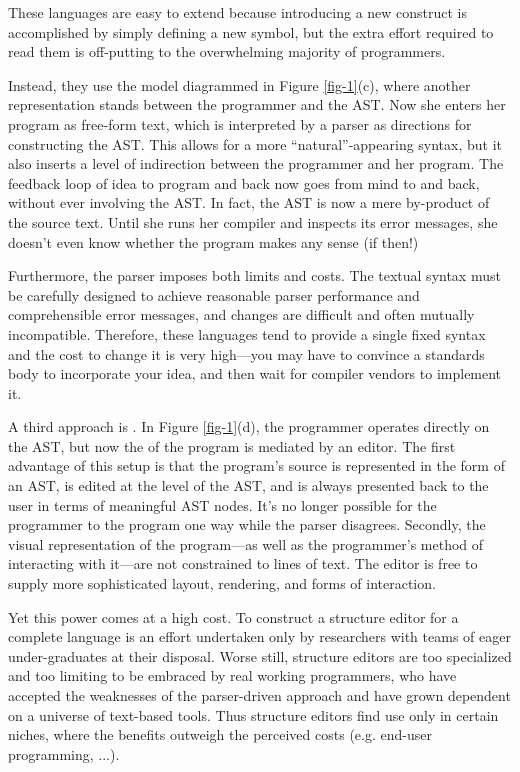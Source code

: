 These languages are easy to extend because introducing a new construct is accomplished by simply defining a new symbol, but the extra effort required to read them is off-putting to the overwhelming majority of programmers.

Instead, they use the model diagrammed in Figure \ref{fig-1}(c), where another representation stands between the programmer and the AST. Now she enters her program as free-form text, which is interpreted by a parser as directions for constructing the AST. This allows for a more ``natural''-appearing syntax, but it also inserts a level of indirection between the programmer and her program. The feedback loop of idea to program and back now goes from mind to  and back, without ever involving the AST. In fact, the AST is now a mere by-product of the source text. Until she runs her compiler and inspects its error messages, she doesn't even know whether the program makes any sense (if then!)

Furthermore, the parser imposes both limits and costs. The textual syntax must be carefully designed to achieve reasonable parser performance and comprehensible error messages, and changes are difficult and often mutually incompatible. Therefore, these languages tend to provide a single fixed syntax and the cost to change it is very high---you may have to convince a standards body to incorporate your idea, and then wait for compiler vendors to implement it.

A third approach is . In Figure \ref{fig-1}(d), the programmer operates directly on the AST, but now the  of the program is mediated by an editor. The first advantage of this setup is that the program's source is represented in the form of an AST, is edited at the level of the AST, and is always presented back to the user in terms of meaningful AST nodes. It's no longer possible for the programmer to  the program one way while the parser disagrees. Secondly, the visual representation of the program---as well as the programmer's method of interacting with it---are not constrained to lines of text. The editor is free to supply more sophisticated layout, rendering, and forms of interaction.

Yet this power comes at a high cost. To construct a structure editor for a complete language is an effort undertaken only by researchers with teams of eager under-graduates at their disposal. Worse still, structure editors are too specialized and too limiting to be embraced by real working programmers, who have accepted the weaknesses of the parser-driven approach and have grown dependent on a universe of text-based tools. Thus structure editors find use only in certain niches, where the benefits outweigh the perceived costs (e.g. end-user programming, ...).\cite{alice}



